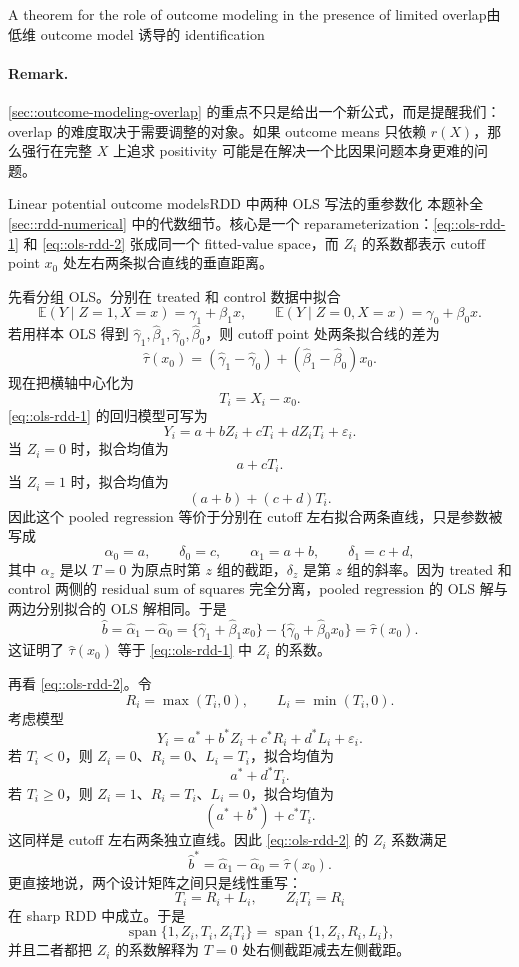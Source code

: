\begin{exercisesolution}{A theorem for the role of outcome modeling in the presence of limited overlap}{由低维 outcome model 诱导的 identification}
\paragraph{Remark.}
\cref{sec::outcome-modeling-overlap} 的重点不只是给出一个新公式，而是提醒我们：overlap 的难度取决于需要调整的对象。如果 outcome means 只依赖 $r(X)$，那么强行在完整 $X$ 上追求 positivity 可能是在解决一个比因果问题本身更难的问题。
\end{exercisesolution}

\begin{exercisesolution}{Linear potential outcome models}{RDD 中两种 OLS 写法的重参数化}
本题补全 \cref{sec::rdd-numerical} 中的代数细节。核心是一个 reparameterization：\cref{eq::ols-rdd-1} 和 \cref{eq::ols-rdd-2} 张成同一个 fitted-value space，而 $Z_i$ 的系数都表示 cutoff point $x_0$ 处左右两条拟合直线的垂直距离。

先看分组 OLS。分别在 treated 和 control 数据中拟合
\[
\mathbb{E}(Y\mid Z=1,X=x)=\gamma_1+\beta_1x,\qquad
\mathbb{E}(Y\mid Z=0,X=x)=\gamma_0+\beta_0x.
\]
若用样本 OLS 得到 $\hat\gamma_1,\hat\beta_1,\hat\gamma_0,\hat\beta_0$，则 cutoff point 处两条拟合线的差为
\[
\hat\tau(x_0)
=(\hat\gamma_1-\hat\gamma_0)+(\hat\beta_1-\hat\beta_0)x_0.
\]
现在把横轴中心化为
\[
T_i=X_i-x_0.
\]
\cref{eq::ols-rdd-1} 的回归模型可写为
\[
Y_i=a+bZ_i+cT_i+dZ_iT_i+\varepsilon_i.
\]
当 $Z_i=0$ 时，拟合均值为
\[
a+cT_i.
\]
当 $Z_i=1$ 时，拟合均值为
\[
(a+b)+(c+d)T_i.
\]
因此这个 pooled regression 等价于分别在 cutoff 左右拟合两条直线，只是参数被写成
\[
\alpha_0=a,\qquad \delta_0=c,\qquad
\alpha_1=a+b,\qquad \delta_1=c+d,
\]
其中 $\alpha_z$ 是以 $T=0$ 为原点时第 $z$ 组的截距，$\delta_z$ 是第 $z$ 组的斜率。因为 treated 和 control 两侧的 residual sum of squares 完全分离，pooled regression 的 OLS 解与两边分别拟合的 OLS 解相同。于是
\[
\hat b=\hat\alpha_1-\hat\alpha_0
=\{\hat\gamma_1+\hat\beta_1x_0\}
-\{\hat\gamma_0+\hat\beta_0x_0\}
=\hat\tau(x_0).
\]
这证明了 $\hat\tau(x_0)$ 等于 \cref{eq::ols-rdd-1} 中 $Z_i$ 的系数。

再看 \cref{eq::ols-rdd-2}。令
\[
R_i=\max(T_i,0),\qquad L_i=\min(T_i,0).
\]
考虑模型
\[
Y_i=a^\ast+b^\ast Z_i+c^\ast R_i+d^\ast L_i+\varepsilon_i.
\]
若 $T_i<0$，则 $Z_i=0$、$R_i=0$、$L_i=T_i$，拟合均值为
\[
a^\ast+d^\ast T_i.
\]
若 $T_i\geq 0$，则 $Z_i=1$、$R_i=T_i$、$L_i=0$，拟合均值为
\[
(a^\ast+b^\ast)+c^\ast T_i.
\]
这同样是 cutoff 左右两条独立直线。因此 \cref{eq::ols-rdd-2} 的 $Z_i$ 系数满足
\[
\hat b^\ast
=\hat\alpha_1-\hat\alpha_0
=\hat\tau(x_0).
\]
更直接地说，两个设计矩阵之间只是线性重写：
\[
T_i=R_i+L_i,\qquad Z_iT_i=R_i
\]
在 sharp RDD 中成立。于是
\[
\operatorname{span}\{1,Z_i,T_i,Z_iT_i\}
=\operatorname{span}\{1,Z_i,R_i,L_i\},
\]
并且二者都把 $Z_i$ 的系数解释为 $T=0$ 处右侧截距减去左侧截距。


\end{exercisesolution}
